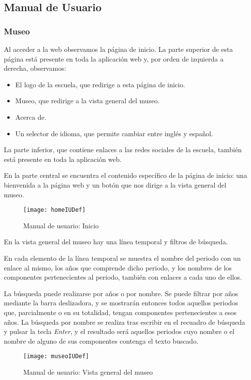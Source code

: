 \subsection{Manual de Usuario} 
\subsubsection{Museo}
Al acceder a la web observamos la página de inicio. La parte superior de esta página está presente en toda la aplicación web y, por orden de izquierda a derecha, observamos:
\begin{itemize}
	\item El logo de la escuela, que redirige a esta página de inicio.
	\item Museo, que redirige a la vista general del museo.
	\item Acerca de.
	\item Un selector de idioma, que permite cambiar entre inglés y español.
\end{itemize}
La parte inferior, que contiene enlaces a las redes sociales de la escuela, también está presente en toda la aplicación web.\par
En la parte central se encuentra el contenido específico de la página de inicio: una bienvenida a la página web y un botón que nos dirige a la vista general del museo.
\begin{figure}[H]
\centering
\texttt{[image: homeIUDef]}
\caption{Manual de usuario: Inicio}
\end{figure}
En la vista general del museo hay una línea temporal y filtros de búsqueda.\par
En cada elemento de la línea temporal se muestra el nombre del periodo con un enlace al mismo, los años que comprende dicho periodo, y los nombres de los componentes pertenecientes al periodo, también con enlaces a cada uno de ellos.\par
La búsqueda puede realizarse por años o por nombre. Se puede filtrar por años mediante la barra deslizadora, y se mostrarán entonces todos aquellos periodos que, parcialmente o en su totalidad, tengan componentes pertenecientes a esos años. La búsqueda por nombre se realiza tras escribir en el recuadro de búsqueda y pulsar la tecla \textit{Enter}, y el resultado será aquellos periodos cuyo nombre o el nombre de alguno de sus componentes contenga el texto buscado.
\begin{figure}[H]
\centering
\texttt{[image: museoIUDef]}
\caption{Manual de usuario: Vista general del museo}
\end{figure}
